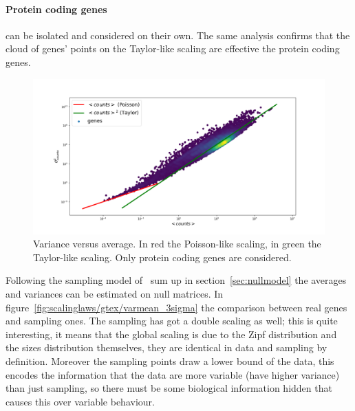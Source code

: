 \paragraph{Protein coding genes} can be isolated and considered on their own. The same analysis confirms that the cloud of genes' points on the Taylor-like scaling are effective the protein coding genes.
\begin{figure}[htb!]
    \centering
    \includegraphics[width=0.9\linewidth]{pictures/scalinglaws/gtex/varmean_loglog_density.png}
    \caption{Variance versus average. In \textcolor{pythonred}{red} the Poisson-like scaling, in \textcolor{pythongreen}{green} the Taylor-like scaling. Only protein coding genes are considered.}
    \label{fig:scalinglaws/gtex/varmean_loglog_density}
\end{figure}
Following the sampling model of~\cite{Mazzolini2018} sum up in section~\ref{sec:nullmodel} the averages and variances can be estimated on null matrices. In figure~\ref{fig:scalinglaws/gtex/varmean_3sigma} the comparison between real genes and sampling ones. The sampling has got a double scaling as well; this is quite interesting, it means that the global scaling is due to the Zipf distribution and the sizes distribution themselves, they are identical in data and sampling by definition.
Moreover the sampling points draw a lower bound of the data, this encodes the information that the data are more variable (have higher variance) than just sampling, so there must be some biological information hidden that causes this over variable behaviour.
